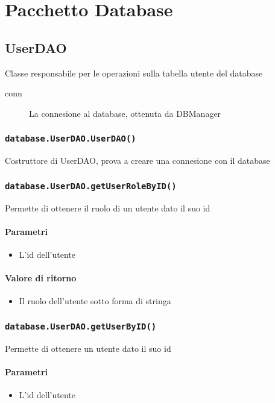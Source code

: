 \section{Pacchetto Database}
\label{sec:package_database}
\subsection{UserDAO}
Classe responsabile per le operazioni sulla tabella utente del database
\begin{description}
\item[conn] La connesione al database, ottenuta da DBManager
\end{description}

\subsubsection{\texttt{database.UserDAO.UserDAO()}}
Costruttore di UserDAO, prova a creare una connesione con il database

\subsubsection{\texttt{database.UserDAO.getUserRoleByID()}}
Permette di ottenere il ruolo di un utente dato il suo id
\paragraph{Parametri}
\begin{itemize}
\item L'id dell'utente
\end{itemize}
\paragraph{Valore di ritorno}
\begin{itemize}
\item Il ruolo dell'utente sotto forma di stringa
\end{itemize}

\subsubsection{\texttt{database.UserDAO.getUserByID()}}
Permette di ottenere un utente dato il suo id
\paragraph{Parametri}
\begin{itemize}
  \item L'id dell'utente
\end{itemize}
